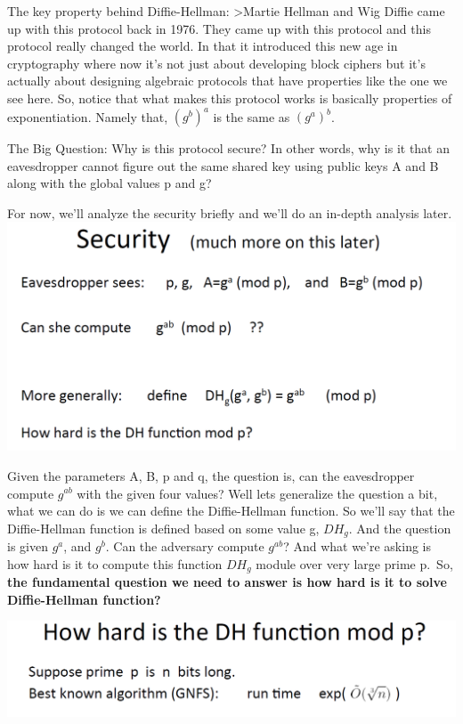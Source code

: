 \documentclass[11pt]{article}
\makeatletter
\def\maxwidth{\ifdim\Gin@nat@width>\linewidth\linewidth
    \else\Gin@nat@width\fi}
\let\Oldincludegraphics\includegraphics
\renewcommand{\includegraphics}[1]{\Oldincludegraphics[width=.8\maxwidth]{#1}}
\makeatother
\begin{document}
The key property behind Diffie-Hellman: \textgreater{}Martie Hellman and
Wig Diffie came up with this protocol back in 1976. They came up with
this protocol and this protocol really changed the world. In that it
introduced this new age in cryptography where now it's not just about
developing block ciphers but it's actually about designing algebraic
protocols that have properties like the one we see here. So, notice that
what makes this protocol works is basically properties of
exponentiation. Namely that, \((g^{b})^{a}\) is the same as
\((g^{a})^{b}\).

The Big Question: Why is this protocol secure? In other words, why is it
that an eavesdropper cannot figure out the same shared key using public
keys A and B along with the global values p and g?

For now, we'll analyze the security briefly and we'll do an in-depth
analysis later. \includegraphics{./Images/Security-DH.png}

Given the parameters A, B, p and q, the question is, can the
eavesdropper compute \(g^{ab}\) with the given four values? Well lets
generalize the question a bit, what we can do is we can define the
Diffie-Hellman function. So we'll say that the Diffie-Hellman function
is defined based on some value g, \(DH_{g}\). And the question is given
\(g^{a}\), and \(g^{b}\). Can the adversary compute \(g^{ab}\)? And what
we're asking is how hard is it to compute this function \(DH_{g}\)
module over very large prime p.~So, \textbf{the fundamental question we
need to answer is how hard is it to solve Diffie-Hellman function?}

\includegraphics{./Images/DH-FxnHardness-1.png}
\end{document}

